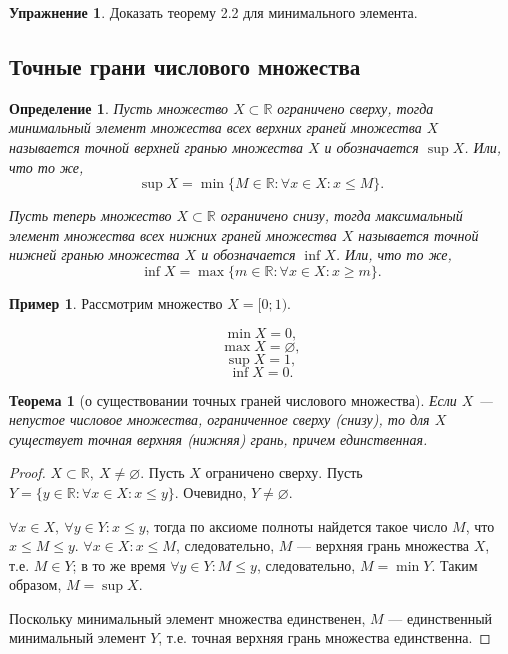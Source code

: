 \documentclass[a4paper,12pt]{article} %
\newtheorem{definition}{Определение}[section]
\newtheorem{theorem}{Теорема}[section]
\theoremstyle{remark}
\theoremstyle{definition}
\newtheorem{exmp}{Пример}[section]
\newtheorem{exercise}{Упражнение}
\begin{document}
\begin{exercise}
   Доказать теорему 2.2 для минимального элемента. 
\end{exercise}

\subsection{Точные грани числового множества}
\begin{definition}
    Пусть множество $X\subset \mathbb{R}$ ограничено сверху, тогда минимальный элемент множества всех верхних граней множества
    $X$ называется точной верхней гранью множества $X$ и обозначается $\sup X$. Или, что то же,
    \[\sup X = \min \{M\in \mathbb{R} : \forall x\in X : x \le M\}.\] 

    Пусть теперь множество $X\subset \mathbb{R}$ ограничено снизу, тогда максимальный элемент множества всех нижних граней
    множества $X$ называется точной нижней гранью множества $X$ и обозначается $\inf X$. Или, что то же,
    \[\inf X = \max \{m\in \mathbb{R} : \forall x\in X : x \ge m\}.\] 
\end{definition}
\begin{exmp}
    Рассмотрим множество $X = [0; 1)$.

    \[\min X = 0,\] 
    \[\max X = \varnothing,\] 
    \[\sup X = 1,\] 
    \[\inf X = 0.\] 
\end{exmp}

\begin{theorem}[о существовании точных граней числового множества]
    Если $X$ --- непустое числовое множества, ограниченное сверху (снизу), то для $X$ существует точная верхняя (нижняя)
    грань, причем единственная.
\end{theorem}
\begin{proof}
   $X\subset \mathbb{R}, \ X \neq \varnothing$. Пусть $X$ ограничено сверху.
   Пусть $Y = \{y\in \mathbb{R} : \forall x\in X : x\le y\}$. Очевидно, $Y\neq \varnothing$.

   $\forall x\in X, \ \forall y\in Y : x \le y$, тогда по аксиоме полноты найдется такое число $M$, что $x \le M \le y$.
   $\forall x \in X : x\le M$, следовательно, $M$ --- верхняя грань множества $X$, т.е. $M\in Y$;
   в то же время $\forall y\in Y : M\le y$, следовательно, $M=\min Y$. Таким образом, $M=\sup X$.

   Поскольку минимальный элемент множества единственен, $M$ --- единственный минимальный элемент $Y$, т.е. точная верхняя грань множества единственна.
\end{proof}
\end{document}
